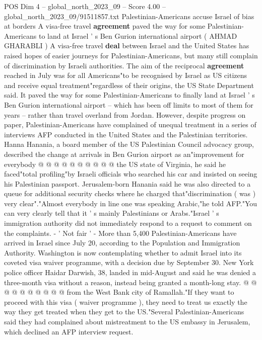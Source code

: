 \begin{textsample}{POS Dim 4 – global\_north\_2023\_09 – Score 4.00 – global\_north\_2023\_09/91511857.txt}  \label{ex:f4_pos_420}
Palestinian-Americans accuse Israel of bias at borders A visa-free travel \textbf{agreement} paved the way for some Palestinian-Americans to land at Israel ' s Ben Gurion international airport ( AHMAD GHARABLI ) A visa-free travel \textbf{deal} between Israel and the United States has raised hopes of easier journeys for Palestinian-Americans, but many still complain of discrimination by Israeli authorities.
The aim of the reciprocal \textbf{agreement} reached in July was for all Americans"to be recognised by Israel as US citizens and receive equal treatment"regardless of their origins, the US State Department said.
It paved the way for some Palestinian-Americans to finally land at Israel ' s Ben Gurion international airport -- which has been off limits to most of them for years -- rather than travel overland from Jordan.
However, despite progress on paper, Palestinian-Americans have complained of unequal treatment in a series of interviews AFP conducted in the United States and the Palestinian territories.
Hanna Hanania, a board member of the US Palestinian Council advocacy group, described the change at arrivals in Ben Gurion airport as an"improvement for everybody @ @ @ @ @ @ @ @ @ @ the US state of Virginia, he said he faced"total profiling"by Israeli officials who searched his car and insisted on seeing his Palestinian passport.
Jerusalem-born Hanania said he was also directed to a queue for additional security checks where he charged that"discrimination ( was ) very clear"."Almost everybody in line one was speaking Arabic,"he told AFP."You can very clearly tell that it ' s mainly Palestinians or Arabs."Israel ' s immigration authority did not immediately respond to a request to comment on the complaints. - ' Not fair ' - More than 5,400 Palestinian-Americans have arrived in Israel since July 20, according to the Population and Immigration Authority.
Washington is now contemplating whether to admit Israel into its coveted visa waiver programme, with a decision due by September 30.
New York police officer Haidar Darwish, 38, landed in mid-August and said he was denied a three-month visa without a reason, instead being granted a month-long stay. @ @ @ @ @ @ @ @ @ @ from the West Bank city of Ramallah."If they want to proceed with this visa ( waiver programme ), they need to treat us exactly the way they get treated when they get to the US."Several Palestinian-Americans said they had complained about mistreatment to the US embassy in Jerusalem, which declined an AFP interview request.

\end{textsample}
